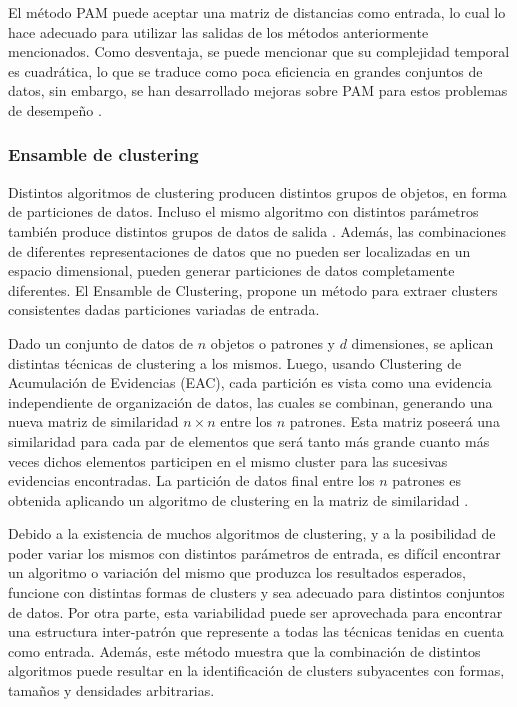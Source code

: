 \bigskip El método PAM puede aceptar una matriz de distancias como entrada, lo cual lo hace adecuado para utilizar las salidas de los métodos anteriormente mencionados. Como desventaja, se puede mencionar que su complejidad temporal es cuadrática, lo que se traduce como poca eficiencia en grandes conjuntos de datos, sin embargo, se han desarrollado mejoras sobre PAM para estos problemas de desempeño \citep{kaufman2009finding}.

\subsubsection{Ensamble de clustering}
Distintos algoritmos de clustering producen distintos grupos de objetos, en forma de particiones de datos. Incluso el mismo algoritmo con distintos parámetros también produce distintos grupos de datos de salida \citep{xu2008clustering}. Además, las combinaciones de diferentes representaciones de datos que no pueden ser localizadas en un espacio dimensional, pueden generar particiones de datos completamente diferentes. El Ensamble de Clustering, propone un método para extraer clusters consistentes dadas particiones variadas de entrada.

\bigskip Dado un conjunto de datos de \(n\) objetos o patrones y \(d\) dimensiones, se aplican distintas técnicas de clustering a los mismos. Luego, usando Clustering de Acumulación de Evidencias (EAC), cada partición es vista como una evidencia independiente de organización de datos, las cuales se combinan, generando una nueva matriz de similaridad \(n \times n\) entre los \(n\) patrones. Esta matriz poseerá una similaridad para cada par de elementos que será tanto más grande cuanto más veces dichos elementos participen en el mismo cluster para las sucesivas evidencias encontradas. La partición de datos final entre los \(n\) patrones es obtenida aplicando un algoritmo de clustering en la matriz de similaridad \citep{fred2005combining}.

\bigskip Debido a la existencia de muchos algoritmos de clustering, y a la posibilidad de poder variar los mismos con distintos parámetros de entrada, es difícil encontrar un algoritmo o variación del mismo que produzca los resultados esperados, funcione con distintas formas de clusters y sea adecuado para distintos conjuntos de datos. Por otra parte, esta variabilidad puede ser aprovechada para encontrar una estructura inter-patrón que represente a todas las técnicas tenidas en cuenta como entrada. Además, este método muestra que la combinación de distintos algoritmos puede resultar en la identificación de clusters subyacentes con formas, tamaños y densidades arbitrarias.

